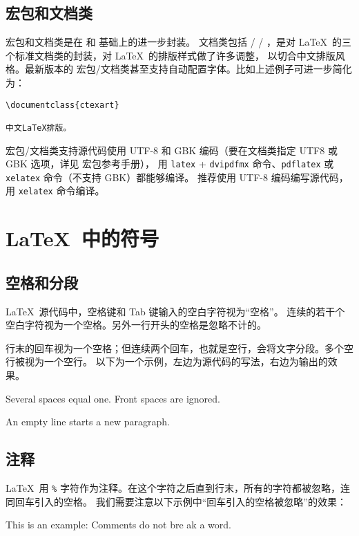 \subsection{ 宏包和文档类}

 宏包和文档类是在  和  基础上的进一步封装。 文档类包括
 /  / ，是对 \LaTeX\ 的三个标准文档类的封装，对 \LaTeX\ 的排版样式做了许多调整，
以切合中文排版风格。最新版本的  宏包/文档类甚至支持自动配置字体。比如上述例子可进一步简化为：
\begin{verbatim}
\documentclass{ctexart}

中文LaTeX排版。

\end{verbatim}

 宏包/文档类支持源代码使用 UTF-8 和 GBK 编码（要在文档类指定 UTF8 或 GBK 选项，详见  宏包参考手册），
用 \texttt{latex} + \texttt{dvipdfmx} 命令、\texttt{pdflatex} 或 \texttt{xelatex} 命令（不支持 GBK）都能够编译。
推荐使用 UTF-8 编码编写源代码，用 \texttt{xelatex} 命令编译。

\section{\LaTeX\ 中的符号}

\subsection{空格和分段}\label{subsec:spaces}

\LaTeX\ 源代码中，空格键和 Tab 键输入的空白字符视为“空格”。
连续的若干个空白字符视为一个空格。另外一行开头的空格是忽略不计的。

行末的回车视为一个空格；但连续两个回车，也就是空行，会将文字分段。多个空行被视为一个空行。
以下为一个示例，左边为源代码的写法，右边为输出的效果。
\begin{example}
Several spaces     equal one.
  Front spaces are ignored.

An empty line starts a new
paragraph.
\end{example}

\subsection{注释}\label{subsec:comments}

\LaTeX\ 用 \texttt\% 字符作为注释。在这个字符之后直到行末，所有的字符都被忽略，连同回车引入的空格。
我们需要注意以下示例中“回车引入的空格被忽略”的效果：
\begin{example}
This is an %
example: Comments do not bre%
ak a word.
\end{example}


